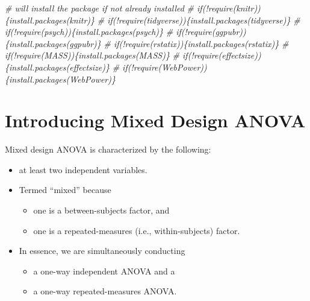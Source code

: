 \documentclass[
  11pt,
]{book}
\newenvironment{Shaded}{\begin{snugshade}}{\end{snugshade}}
\newcommand{\CommentTok}[1]{\textcolor[rgb]{0.37,0.37,0.37}{\textit{#1}}}
\providecommand{\tightlist}{%
  \setlength{\itemsep}{0pt}\setlength{\parskip}{0pt}}
\begin{document}
\begin{Shaded}
\begin{Highlighting}[]
\CommentTok{\# will install the package if not already installed}
\CommentTok{\# if(!require(knitr))\{install.packages(\textquotesingle{}knitr\textquotesingle{})\}}
\CommentTok{\# if(!require(tidyverse))\{install.packages(\textquotesingle{}tidyverse\textquotesingle{})\}}
\CommentTok{\# if(!require(psych))\{install.packages(\textquotesingle{}psych\textquotesingle{})\}}
\CommentTok{\# if(!require(ggpubr))\{install.packages(\textquotesingle{}ggpubr\textquotesingle{})\}}
\CommentTok{\# if(!require(rstatix))\{install.packages(\textquotesingle{}rstatix\textquotesingle{})\}}
\CommentTok{\# if(!require(MASS))\{install.packages(\textquotesingle{}MASS\textquotesingle{})\}}
\CommentTok{\# if(!require(effectsize))\{install.packages(\textquotesingle{}effectsize\textquotesingle{})\}}
\CommentTok{\# if(!require(WebPower))\{install.packages(\textquotesingle{}WebPower\textquotesingle{})\}}
\end{Highlighting}
\end{Shaded}

\hypertarget{introducing-mixed-design-anova}{%
\section{Introducing Mixed Design ANOVA}\label{introducing-mixed-design-anova}}

Mixed design ANOVA is characterized by the following:

\begin{itemize}
\tightlist
\item
  at least two independent variables.
\item
  Termed ``mixed'' because

  \begin{itemize}
  \tightlist
  \item
    one is a between-subjects factor, and
  \item
    one is a repeated-measures (i.e., within-subjects) factor.
  \end{itemize}
\item
  In essence, we are simultaneously conducting

  \begin{itemize}
  \tightlist
  \item
    a one-way independent ANOVA and a
  \item
    a one-way repeated-measures ANOVA.
  \end{itemize}
\end{itemize}
\end{document}
